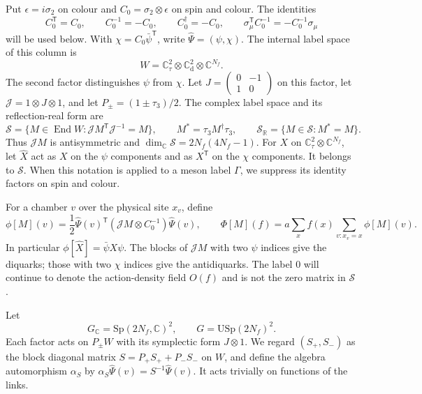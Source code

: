 \documentclass[11pt,letterpaper,reqno]{amsart}
\theoremstyle{definition}
\theoremstyle{remark}
\begin{document}
Put $\epsilon=i\sigma_2$ on colour and
$C_0=\sigma_2\otimes\epsilon$ on spin and colour. The identities
\[
 C_0^{\mathsf T}=C_0,\qquad C_0^{-1}=-C_0,
 \qquad C_0^\dagger=-C_0,\qquad
 \sigma_\mu^{\mathsf T}C_0^{-1}=-C_0^{-1}\sigma_\mu
\]
will be used below. With $\chi=C_0\bar\psi^{\mathsf T}$, write
$\widehat\Psi=(\psi,\chi)$. The internal label space of this
column is
\[
 W=\mathbb C^2_\tau\otimes\mathbb C^2_{\mathrm d}
                         \otimes\mathbb C^{N_f}.
\]
The second factor distinguishes $\psi$ from $\chi$.
Let $J=\left(\begin{smallmatrix}0&-1\\1&0\end{smallmatrix}\right)$
on this factor, let $\mathcal J=1\otimes J\otimes1$, and let
$P_\pm=(1\pm\tau_3)/2$. The complex label space and its
reflection-real form are
\begin{equation}\label{C-401-2}
 \mathscr S=\{M\in\operatorname{End}W:
                 \mathcal JM^{\mathsf T}\mathcal J^{-1}=M\},
 \qquad M^*=\tau_3M^\dagger\tau_3,
 \qquad\mathscr S_{\mathbb R}=\{M\in\mathscr S:M^*=M\}.
\end{equation}
Thus $\mathcal JM$ is antisymmetric and
$\dim_{\mathbb C}\mathscr S=2N_f(4N_f-1)$.
For $X$ on $\mathbb C^2_\tau\otimes\mathbb C^{N_f}$, let
$\widehat X$ act as $X$ on the $\psi$ components and as
$X^{\mathsf T}$ on the $\chi$ components. It belongs to
$\mathscr S$. When this notation is applied to a meson label
$\Gamma$, we suppress its identity factors on spin and colour.

For a chamber $v$ over the physical site $x_v$, define
\[
 \phi[M](v)=\frac12\widehat\Psi(v)^{\mathsf T}
                (\mathcal JM\otimes C_0^{-1})\widehat\Psi(v),
 \qquad
 \Phi[M](f)=a\sum_x f(x)\sum_{v:x_v=x}\phi[M](v).
\]
In particular $\phi[\widehat X]=\bar\psi X\psi$.
The blocks of $\mathcal JM$ with two $\psi$ indices give the
diquarks; those with two $\chi$ indices give the antidiquarks.
The label $0$ will continue to denote the action-density field
$O(f)$ and is not the zero matrix in $\mathscr S$.

Let
\begin{equation}\label{C-401-3}
 G_{\mathbb C}=\mathrm{Sp}(2N_f,\mathbb C)^2,
 \qquad G=\mathrm{USp}(2N_f)^2.
\end{equation}
Each factor acts on $P_\pm W$ with its symplectic form
$J\otimes1$. We regard $(S_+,S_-)$ as the block diagonal
matrix $S=P_+S_++P_-S_-$ on $W$, and define the algebra
automorphism $\alpha_S$ by
$\alpha_S\widehat\Psi(v)=S^{-1}\widehat\Psi(v)$.
It acts trivially on functions of the links.
\end{document}
